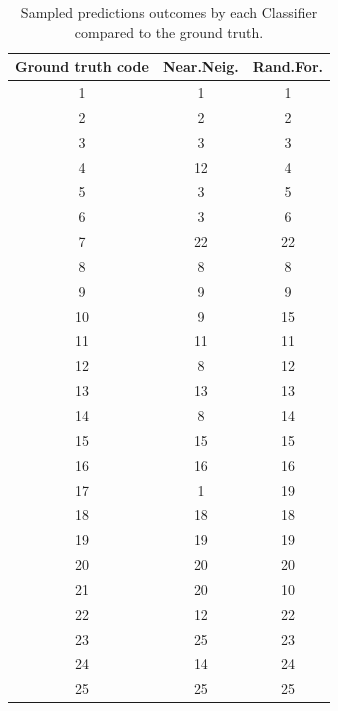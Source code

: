 \documentclass[10pt,twocolumn,letterpaper]{article}
\begin{document}
\begin{table}
\begin{center}
\begin{tabular}{|c|c|c|}
\hline
Ground truth code& Near.Neig. & Rand.For. \\
\hline\hline
     1  &   1  &   1\\
     2  &   2  &   2\\
     3  &   3  &   3\\
     4  &  12  &   4\\
     5  &   3  &   5\\
     6  &   3  &   6\\
     7  &  22  &  22\\
     8  &   8  &   8\\
     9  &   9  &   9\\
    10  &   9  &  15\\
    11  &  11  &  11\\
    12  &   8  &  12\\
    13  &  13  &  13\\
    14  &   8  &  14\\
    15  &  15  &  15\\
    16  &  16  &  16\\
    17  &   1  &  19\\
    18  &  18  &  18\\
    19  &  19  &  19\\
    20  &  20  &  20\\
    21  &  20  &  10\\
    22  &  12  &  22\\
    23  &  25  &  23\\
    24  &  14  &  24\\
    25  &  25  &  25\\
\hline
\end{tabular}
\caption{Sampled predictions outcomes by each Classifier compared to the ground truth.}
\label{tab:classout}
\end{center}
\end{table}
\end{document}
